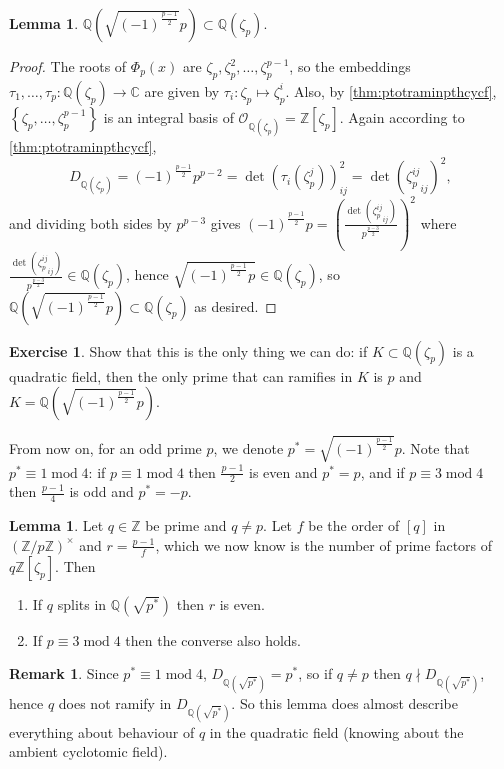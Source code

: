 \documentclass{article}
\newcommand{\Z}{\mathbb{Z}}
\newcommand{\Q}{\mathbb{Q}}
\newcommand{\C}{\mathbb{C}}
\newcommand{\Mod}{\operatorname{mod}}
\newcommand{\ri}{\mathcal{O}}
\theoremstyle{definition}
\newtheorem{lemma}[defn]{Lemma}
\newtheorem{exe}[defn]{Exercise}
\newtheorem{remark}[defn]{Remark}
\begin{document}
\begin{lemma}
$\Q\left(\sqrt{(-1)^{\frac{p-1}{2}}}p\right)\subset\Q(\zeta_p)$.
\end{lemma}
\begin{proof}
The roots of $\Phi_p(x)$ are $\zeta_p,\zeta_p^2,\ldots,\zeta_p^{p-1}$, so the embeddings $\tau_1,\ldots,\tau_p:\Q(\zeta_p)\rightarrow\C$ are given by $\tau_i:\zeta_p\mapsto \zeta_p^i$. Also, by \ref{thm:ptotraminpthcycf}, $\left\{\zeta_p,\ldots,\zeta_p^{p-1}\right\}$ is an integral basis of $\ri_{\Q(\zeta_p)}=\Z[\zeta_p]$. Again according to \ref{thm:ptotraminpthcycf},
\[
D_{\Q(\zeta_p)}=(-1)^{\frac{p-1}{2}}p^{p-2}=\det (\tau_i(\zeta_p^j))_{ij}^2=\det \left({\zeta_p^{ij}}_{ij}\right)^2,
\]
and dividing both sides by $p^{p-3}$ gives $(-1)^{\frac{p-1}{2}}p=\left(\frac{\det \left({\zeta_p^{ij}}_{ij}\right)}{p^{\frac{p-3}{2}}}\right)^2$ where $\frac{\det \left({\zeta_p^{ij}}_{ij}\right)}{p^{\frac{p-3}{2}}}\in\Q(\zeta_p)$, hence $\sqrt{(-1)^{\frac{p-1}{2}}p}\in\Q(\zeta_p)$, so $\Q\left(\sqrt{(-1)^{\frac{p-1}{2}}}p\right)\subset\Q(\zeta_p)$ as desired.
\end{proof}

\begin{exe}
Show that this is the only thing we can do: if $K\subset\Q(\zeta_p)$ is a quadratic field, then the only prime that can ramifies in $K$ is $p$ and $K=\Q\left(\sqrt{(-1)^{\frac{p-1}{2}}}p\right)$.
\end{exe}
From now on, for an odd prime $p$, we denote $p^\ast=\sqrt{(-1)^{\frac{p-1}{2}}}p$. Note that $p^\ast\equiv 1\Mod 4$: if $p\equiv 1\Mod 4$ then $\frac{p-1}{2}$ is even and $p^\ast=p$, and if $p\equiv 3\Mod 4$ then $\frac{p-1}{4}$ is odd and $p^\ast=-p$.

\begin{lemma}
\label{lemma:qsplitsthenriseven}
Let $q\in\Z$ be prime and $q\neq p$. Let $f$ be the order of $[q]$ in $(\Z/p\Z)^\times$ and $r=\frac{p-1}{f}$, which we now know is the number of prime factors of $q\Z[\zeta_p]$. Then
\begin{enumerate}
\item If $q$ splits in $\Q\left(\sqrt{p^\ast}\right)$ then $r$ is even.
\item If $p\equiv 3\Mod 4$ then the converse also holds.
\end{enumerate}
\end{lemma}

\begin{remark}
Since $p^\ast\equiv 1\Mod 4$, $D_{\Q\left(\sqrt{p^\ast}\right)}=p^\ast$, so if $q\neq p$ then $q\nmid D_{\Q\left(\sqrt{p^\ast}\right)}$, hence $q$ does not ramify in $D_{\Q\left(\sqrt{p^\ast}\right)}$. So this lemma does almost describe everything about behaviour of $q$ in the quadratic field (knowing about the ambient cyclotomic field).
\end{remark}
\end{document}
